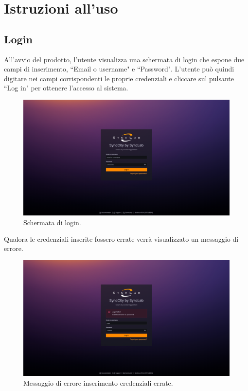 \documentclass[8pt]{article}
\begin{document}
\section{Istruzioni all'uso} \label{sec:instructions}
\setlength\parindent{0pt}
\subsection{Login}
All'avvio del prodotto, l'utente visualizza una schermata di login che espone due campi di inserimento, ``Email o username" e ``Password". L'utente può quindi digitare nei campi corrispondenti le proprie credenziali e cliccare sul pulsante ``Log in" per ottenere l'accesso al sistema. 
\begin{figure}[H]
    \centering
    \includegraphics[width=15cm]{./images_mu/login.png}
    \caption{Schermata di login.}
    \label{figure:Schermata di login.}
\end{figure}
Qualora le credenziali inserite fossero errate verrà visualizzato un messaggio di errore.
\begin{figure}[H]
    \centering
    \includegraphics[width=15cm]{./images_mu/login_error.png}
    \caption{Messaggio di errore inserimento credenziali errate.}
    \label{figure:Messaggio di errore inserimento credenziali errate.}
\end{figure}
\end{document}
